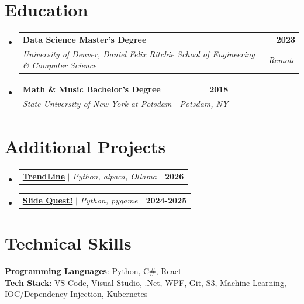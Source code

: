 \documentclass[letterpaper,11pt]{article}
\makeatletter
\newcommand{\projectDescription}[1]{
  \item\small{
    {#1 \vspace{-2pt}}
  }
}
\newcommand{\educationHeading}[4]{
  \vspace{-2pt}\item
    \begin{tabular*}{1.0\textwidth}[t]{l@{\extracolsep{\fill}}r}
      {\small\textbf{#1}} & {\small\textbf{#2}} \\
      {\small{\textsl{#3}}} & {\small{\textsl{#4}}} \\
    \end{tabular*}\vspace{-10pt}
}
\newcommand{\resumeProjectHeading}[2]{
    \item
    \begin{tabular*}{1.001\textwidth}{l@{\extracolsep{\fill}}r}
      \small#1 & \textbf{\small #2}\\
    \end{tabular*}\vspace{-6pt}
}
\newcommand{\resumeSubHeadingListStart}{\begin{itemize}[leftmargin=0.0in, label={}]}
\newcommand{\resumeSubHeadingListEnd}{\end{itemize}}
\makeatother
\begin{document}
\section{Education}
\resumeSubHeadingListStart
  \educationHeading
    {Data Science Master's Degree}{2023}
    {University of Denver, Daniel Felix Ritchie School of Engineering \& Computer Science}{Remote}
  \educationHeading
    {Math \& Music Bachelor's Degree}{2018}
    {State University of New York at Potsdam}{Potsdam, NY}
\resumeSubHeadingListEnd

\section{Additional Projects}
    \vspace{-5pt}
      \resumeSubHeadingListStart
          \resumeProjectHeading
          {\textbf{\href{https://trendline.schmidlin.casa}{TrendLine}} $|$ \emph{Python, alpaca, Ollama}}{2026}
            \vspace{-13pt}
      \resumeProjectHeading
          {\textbf{\href{https://slide-quest.schmidlin.casa}{Slide Quest!}} $|$ \emph{Python, pygame}}{2024-2025}
          \vspace{-13pt}
    \resumeSubHeadingListEnd
\vspace{-8pt}


%
\section{Technical Skills}
 \begin{itemize}[leftmargin=0.15in, label={}]
    \small{\item{
     \textbf{Programming Languages}{: Python, C\#, React} \\
     \textbf{Tech Stack}{: VS Code, Visual Studio, .Net, WPF, Git, S3, Machine Learning, IOC/Dependency Injection, Kubernetes} \\
    }}
 \end{itemize}
 \vspace{-16pt}
\end{document}
